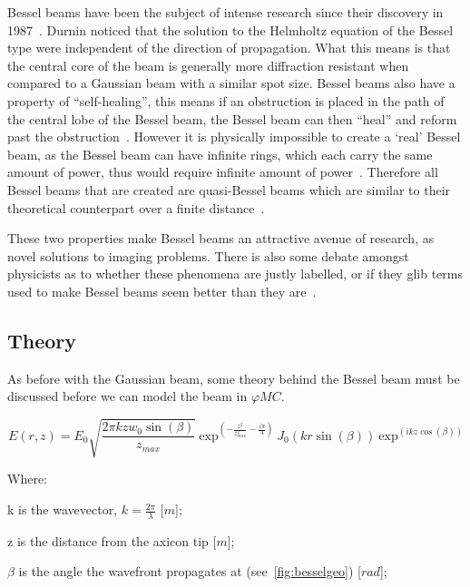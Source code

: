 Bessel beams have been the subject of intense research since their discovery in 1987~\cite{durnin1987diffraction,durnin1987exact}. 
Durnin noticed that the solution to the Helmholtz equation of the Bessel type were independent of the direction of propagation.
What this means is that the central core of the beam is generally more diffraction resistant when compared to a Gaussian beam with a similar spot size.
Bessel beams also have a property of ``self-healing'', this means if an obstruction is placed in the path of the central lobe of the Bessel beam, the Bessel beam can then ``heal'' and reform past the obstruction~\cite{mcgloin2005bessel}.
However it is physically impossible to create a `real' Bessel beam, as the Bessel beam can have infinite rings, which each carry the same amount of power, thus would require infinite amount of power~\cite{durnin1987diffraction}.
Therefore all Bessel beams that are created are quasi-Bessel beams which are similar to their theoretical counterpart over a finite distance~\cite{durnin1987diffraction}.


These two properties make Bessel beams an attractive avenue of research, as novel solutions to imaging problems.
There is also some debate amongst physicists as to whether these phenomena are justly labelled, or if they glib terms used to make Bessel beams seem better than they are~\cite{debeer1987comment,harvey1984spot,durnin1987reply,sprangle1991comment,durnin1991durnin}.

\subsection{Theory}
As before with the Gaussian beam, some theory behind the Bessel beam must be discussed before we can model the beam in $\varphi MC$.

\begin{equation}
    E(r,z)=E_0\sqrt{\frac{2\pi k z w_0\sin(\beta)}{z_{max}}}\ \text{exp}^{\left(-\frac{z^2}{z_{max}^2}-\frac{i\pi}{4}\right)}\ J_0\left(kr\sin(\beta)\right)\ \text{exp}^{\left(ikz\cos(\beta)\right)}
    \label{eqn:besselEfield}
\end{equation}

\noindent Where:

    \indent k is the wavevector, $k=\tfrac{2\pi}{\lambda}$ [$m$];

    \indent z is the distance from the axicon tip [$m$]; 

    \indent $\beta$ is the angle the wavefront propagates at (see~\cref{fig:besselgeo}) [$rad$]; 

